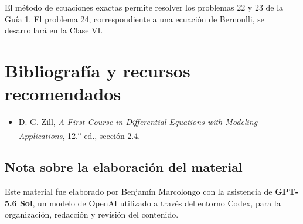 \documentclass[12pt,a4paper]{article}
\begin{document}
	El método de ecuaciones exactas permite resolver los problemas 22 y 23 de la Guía 1. El problema 24, correspondiente a una ecuación de Bernoulli, se desarrollará en la Clase VI.

	\section*{Bibliografía y recursos recomendados}

	\begin{itemize}[leftmargin=*]
		\item D. G. Zill, \textit{A First Course in Differential Equations with Modeling Applications}, 12.\textsuperscript{a} ed., sección 2.4.
	\end{itemize}

	\subsection*{Nota sobre la elaboración del material}

	Este material fue elaborado por Benjamín Marcolongo con la asistencia de \textbf{GPT-5.6 Sol}, un modelo de OpenAI utilizado a través del entorno Codex, para la organización, redacción y revisión del contenido.
\end{document}
